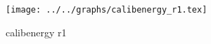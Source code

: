 \begin{figure}[h] \centering \texttt{[image: ../../graphs/calibenergy\_r1.tex]}\caption{calibenergy r1}\label{gr:calibenergy_r1} \end{figure}
